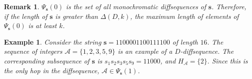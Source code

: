 \documentclass[11pt]{article}
\newtheorem{rem}{Remark}
\newtheorem{ex}{Example}
\newtheorem{definition}{Definition}
\begin{document}
\begin{rem}
    $\Psi_{\mathbf{s}}(0)$ is the set of all monochromatic diffsequences of $\mathbf{s}$. Therefore, if the length of $\mathbf{s}$ is greater than $\Delta(D,k)$, the maximum length of elements of $\Psi_{\mathbf{s}}(0)$ is at least $k$.
\end{rem}

\begin{ex}\label{hop example}
Consider the string $\mathbf{s}=1100001100111100$ of length $16$. The sequence of integers $\mathcal{A} = \{1,2,3,5,9\}$ is an example of a $D$-diffsequence. The corresponding subsequence of $\mathbf{s}$ is $s_1s_2s_3s_5s_9 = 11000$, and $H_{\mathcal{A}} = \{2\}$. Since this is the only hop in the diffsequence, $\mathcal{A} \in \Psi_{\mathbf{s}}(1)$.   
\end{ex}





 
\end{document}
